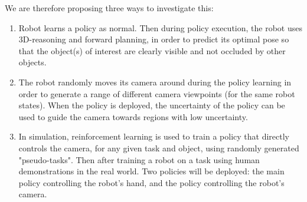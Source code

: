     We are therefore proposing three ways to investigate this:
    \begin{enumerate}
      \item Robot learns a policy as normal. Then during policy execution, the robot uses 3D-reasoning and forward planning, in order to predict its optimal pose so that the object(s) of interest are clearly visible and not occluded by other objects.
      \item The robot randomly moves its camera around during the policy learning in order to generate a range of different camera viewpoints (for the same robot states). When the policy is deployed, the uncertainty of the policy can be used to guide the camera towards regions with low uncertainty.
      \item In simulation, reinforcement learning is used to train a policy that directly controls the camera, for any given task and object, using randomly generated "pseudo-tasks". Then after training a robot on a task using human demonstrations in the real world. Two policies will be deployed: the main policy controlling the robot's hand, and the policy controlling the robot's camera.
\end{enumerate}


